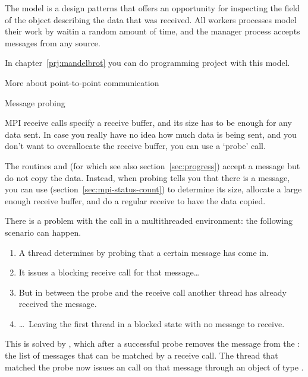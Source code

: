 The  model is a
design patterns that offers an opportunity for inspecting the
 field of the 
object describing the data that was received.
All workers processes model their work by waitin a random amount of time,
and the manager process accepts messages from any source.


In chapter~\ref{prj:mandelbrot} you can do programming project with
this model.


 {More about point-to-point communication}

 {Message probing}
\label{sec:mpi-probe}

MPI receive calls specify a receive buffer, and its size has to be
enough for any data sent. In case you really have no idea how much data
is being sent, and you don't want to overallocate the receive buffer,
you can use a `probe' call.

The routines  and 
(for which see also section~\ref{sec:progress})
accept a message but do not copy the data.
Instead, when probing tells you that there is a
message, you can use 
(section~\ref{sec:mpi-status-count})
to determine its size,
allocate a large enough receive buffer, and do a regular receive to
have the data copied.


There is a problem with the  call in a
multithreaded environment: the following scenario can happen.
\begin{enumerate}
\item A thread determines by probing that a certain message has come
  in.
\item It issues a blocking receive call for that message\dots
\item But in between the probe and the receive call another thread
  has already received the message.
\item \dots~Leaving the first thread in a blocked state with no
  message to receive.
\end{enumerate}
This is solved by , which after a successful
probe removes the message from the : the
list of messages that can be matched by a receive call. The thread
that matched the probe now issues an  call on
that message through an object of type .

